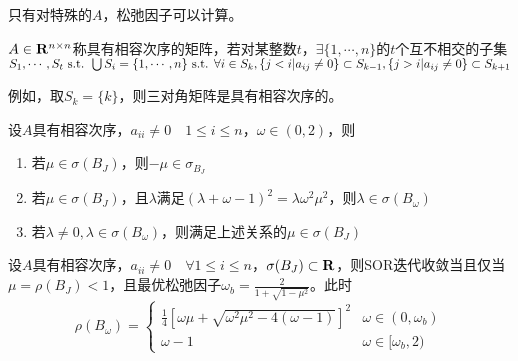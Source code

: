 \documentclass{ctexart}
\begin{document}
只有对特殊的$A$，松弛因子可以计算。

\begin{Def}
$A\in \mathbf{R}^{n\times n}$称具有相容次序的矩阵，若对某整数$t$，$\exists \{1,\cdots,n\}$的$t$个互不相交的子集$S_1,\cdots, S_t\text{ s.t. } \bigcup S_i=\{1,\cdots,n\}\text{ s.t. }\forall i\in S_k,\{j<i|a_{ij}\neq 0\}\subset S_{k-1},\{j>i|a_{ij}\neq 0\}\subset S_{k+1}$
\end{Def}

例如，取$S_k=\{k\}$，则三对角矩阵是具有相容次序的。

\begin{Thm}
设$A$具有相容次序，$a_{ii}\neq 0\quad 1\leq i\leq n$，$\omega\in (0,2)$，则
\begin{enumerate}
\item 若$\mu\in\sigma(B_J)$，则$-\mu\in\sigma_{B_J}$
\item 若$\mu\in\sigma(B_J)$，且$\lambda$满足$(\lambda+\omega-1)^2=\lambda\omega^2\mu^2$，则$\lambda\in\sigma(B_\omega)$
\item 若$\lambda\neq 0,\lambda\in\sigma(B_\omega)$，则满足上述关系的$\mu\in\sigma(B_J)$
\end{enumerate}
\end{Thm}

\begin{Thm}
设$A$具有相容次序，$a_{ii}\neq 0\quad \forall 1\leq i\leq n$，$\sigma(B_J)\subset \mathbf{R}$，则SOR迭代收敛当且仅当$\mu=\rho(B_J)<1$，且最优松弛因子$\omega_b=\frac{2}{1+\sqrt{1-\mu^2}}$。此时
\[\rho(B_\omega)=\begin{cases}\frac{1}{4}[\omega\mu+\sqrt{\omega^2\mu^2-4(\omega-1)}]^2&\omega\in(0,\omega_b)\\\omega-1&\omega\in [\omega_b,2)\end{cases}\]
\end{Thm}
\end{document}
